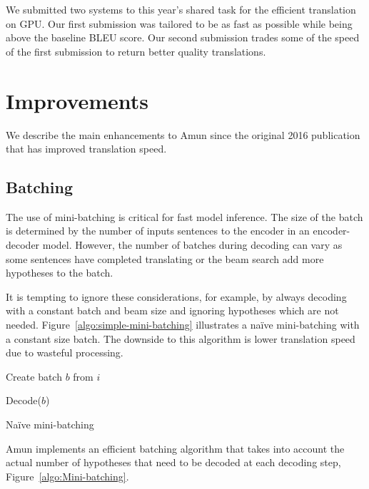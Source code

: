 \documentclass[11pt,a4paper]{article}
\begin{document}
We submitted two systems to this year's shared task for the efficient translation on GPU. Our first submission was tailored to be as fast as possible while being above the baseline BLEU score. Our second submission trades some of the speed of the first submission to return better quality translations.



\section{Improvements}

We describe the main enhancements to Amun since the original 2016 publication that has improved translation speed.

\subsection{Batching}

The use of mini-batching is critical for fast model inference. The size of the batch is determined by the number of inputs sentences to the encoder in an encoder-decoder model. However, the number of batches during decoding can vary as some sentences have completed translating or the beam search add more hypotheses to the batch.

It is tempting to ignore these considerations, for example, by always decoding with a constant batch and beam size and ignoring hypotheses which are not needed. Figure~\ref{algo:simple-mini-batching} illustrates a na\"ive mini-batching with a constant size batch. The downside to this algorithm is lower translation speed due to wasteful processing.

\begin{algorithm}
\begin{algorithmic}

\State Create batch $b$ from $i$

  \State Decode($b$)
\EndWhile

\EndProcedure

\end{algorithmic}
\caption{Na\"ive mini-batching}
\label{algo:simple-mini-batching}
\end{algorithm}

Amun implements an efficient batching algorithm that takes into account the actual number of hypotheses that need to be decoded at each decoding step, Figure~\ref{algo:Mini-batching}.
\end{document}
